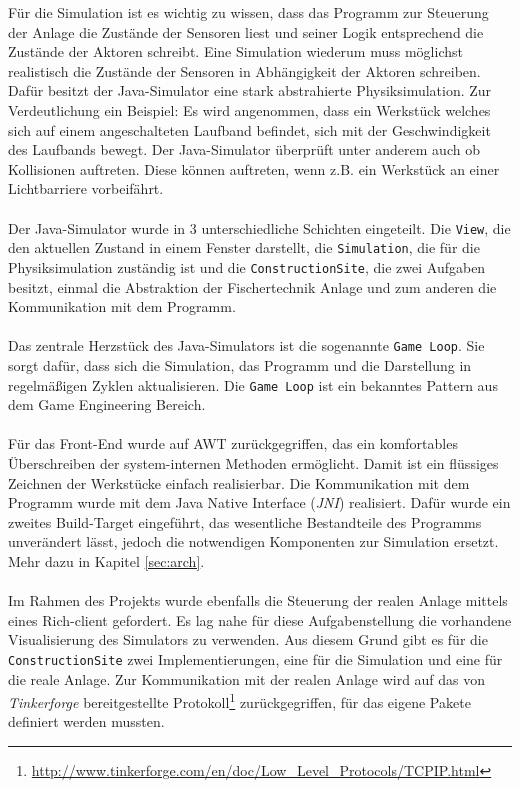 \documentclass[fontsize=11pt,a4paper,final]{scrartcl}[2003/01/01]
\begin{document}
Für die Simulation ist es wichtig zu wissen, dass das Programm zur Steuerung der Anlage die Zustände der Sensoren liest und seiner Logik entsprechend die Zustände der Aktoren schreibt. Eine Simulation wiederum muss möglichst realistisch die Zustände der Sensoren in Abhängigkeit der Aktoren schreiben. Dafür besitzt der Java-Simulator eine stark abstrahierte Physiksimulation. Zur Verdeutlichung ein Beispiel: Es wird angenommen, dass ein Werkstück welches sich auf einem angeschalteten Laufband befindet, sich mit der Geschwindigkeit des Laufbands bewegt. Der Java-Simulator überprüft unter anderem auch ob Kollisionen auftreten. Diese können auftreten, wenn z.B. ein Werkstück an einer Lichtbarriere vorbeifährt.\\
\\
Der Java-Simulator wurde in 3 unterschiedliche Schichten eingeteilt. Die \lstinline|View|, die den aktuellen Zustand in einem Fenster darstellt, die \lstinline|Simulation|, die für die Physiksimulation zuständig ist und die \lstinline|ConstructionSite|, die zwei Aufgaben besitzt, einmal die Abstraktion der Fischertechnik Anlage und zum anderen die Kommunikation mit dem Programm.\\
\\
Das zentrale Herzstück des Java-Simulators ist die sogenannte \lstinline|Game Loop|. Sie sorgt dafür, dass sich die Simulation, das Programm und die Darstellung in regelmäßigen Zyklen aktualisieren. Die \lstinline|Game Loop| ist ein bekanntes Pattern aus dem Game Engineering Bereich.\\
\\
Für das Front-End wurde auf AWT zurückgegriffen, das ein komfortables Überschreiben der system-internen Methoden ermöglicht. Damit ist ein flüssiges Zeichnen der Werkstücke einfach realisierbar. Die Kommunikation mit dem Programm wurde mit dem Java Native Interface (\textit{JNI}) realisiert. Dafür wurde ein zweites Build-Target eingeführt, das wesentliche Bestandteile des Programms unverändert lässt, jedoch die notwendigen Komponenten zur Simulation ersetzt. Mehr dazu in Kapitel \ref{sec:arch}.\\
\\
Im Rahmen des Projekts wurde ebenfalls die Steuerung der realen Anlage mittels eines Rich-client gefordert. Es lag nahe für diese Aufgabenstellung die vorhandene Visualisierung des Simulators zu verwenden. Aus diesem Grund gibt es für die \lstinline|ConstructionSite| zwei Implementierungen, eine für die Simulation und eine für die reale Anlage. Zur Kommunikation mit der realen Anlage wird auf das von \textit{Tinkerforge} bereitgestellte Protokoll\footnote{\url{http://www.tinkerforge.com/en/doc/Low_Level_Protocols/TCPIP.html}} zurückgegriffen, für das eigene Pakete definiert werden mussten.\\
\end{document}
